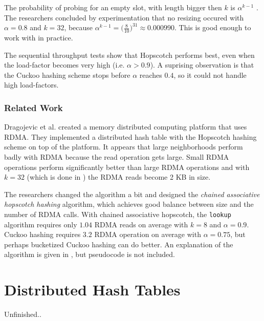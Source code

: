 The probability of probing for an empty slot, with length bigger then $k$ is $\alpha^{k - 1}$ \cite{hopscotch}. The researchers concluded by experimentation that no resizing occured with $\alpha = 0.8$ and $k = 32$, because $\alpha^{k - 1} = \big ( \frac{8}{10} \big )^{31} \approx 0.000990$. This is good enough to work with in practice.

The sequential throughput tests show that Hopscotch performs best, even when the load-factor becomes very high (i.e. $\alpha > 0.9$). A suprising observation is that the Cuckoo hashing scheme stops before $\alpha$ reaches $0.4$, so it could not handle high load-factors. 

\subsubsection{Related Work}
Dragojevic et al. \cite{farm} created a memory distributed computing platform that uses RDMA. They implemented a distributed hash table with the Hopscotch hashing scheme on top of the platform. It appears that large neighborhoods perform badly with RDMA because the read operation gets large. Small RDMA operations perform significantly better than large RDMA operations and with $k = 32$ (which is done in \cite{hopscotch}) the RDMA reads become 2 KB in size. 

The researchers changed the algorithm a bit and designed the \emph{chained associative hopscotch hashing} algorithm, which achieves good balance between size and the number of RDMA calls. With chained associative hopscotch, the \texttt{lookup} algorithm requires only $1.04$ RDMA reads on average with $k = 8$ and $\alpha = 0.9$. Cuckoo hashing requires $3.2$ RDMA operation on average with $\alpha = 0.75$, but perhaps bucketized Cuckoo hashing can do better. An explanation of the algorithm is given in \cite{farm}, but pseudocode is not included.

\section{Distributed Hash Tables}
Unfinished..